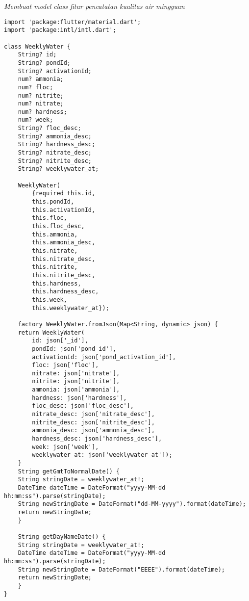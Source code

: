	\textit{Membuat model class fitur pencatatan kualitas air mingguan}
	\begin{lstlisting}
import 'package:flutter/material.dart';
import 'package:intl/intl.dart';

class WeeklyWater {
    String? id;
    String? pondId;
    String? activationId;
    num? ammonia;
    num? floc;
    num? nitrite;
    num? nitrate;
    num? hardness;
    num? week;
    String? floc_desc;
    String? ammonia_desc;
    String? hardness_desc;
    String? nitrate_desc;
    String? nitrite_desc;
    String? weeklywater_at;

    WeeklyWater(
        {required this.id,
        this.pondId,
        this.activationId,
        this.floc,
        this.floc_desc,
        this.ammonia,
        this.ammonia_desc,
        this.nitrate,
        this.nitrate_desc,
        this.nitrite,
        this.nitrite_desc,
        this.hardness,
        this.hardness_desc,
        this.week,
        this.weeklywater_at});

    factory WeeklyWater.fromJson(Map<String, dynamic> json) {
    return WeeklyWater(
        id: json['_id'],
        pondId: json['pond_id'],
        activationId: json['pond_activation_id'],
        floc: json['floc'],
        nitrate: json['nitrate'],
        nitrite: json['nitrite'],
        ammonia: json['ammonia'],
        hardness: json['hardness'],
        floc_desc: json['floc_desc'],
        nitrate_desc: json['nitrate_desc'],
        nitrite_desc: json['nitrite_desc'],
        ammonia_desc: json['ammonia_desc'],
        hardness_desc: json['hardness_desc'],
        week: json['week'],
        weeklywater_at: json['weeklywater_at']);
    }
    String getGmtToNormalDate() {
    String stringDate = weeklywater_at!;
    DateTime dateTime = DateFormat("yyyy-MM-dd hh:mm:ss").parse(stringDate);
    String newStringDate = DateFormat("dd-MM-yyyy").format(dateTime);
    return newStringDate;
    }

    String getDayNameDate() {
    String stringDate = weeklywater_at!;
    DateTime dateTime = DateFormat("yyyy-MM-dd hh:mm:ss").parse(stringDate);
    String newStringDate = DateFormat("EEEE").format(dateTime);
    return newStringDate;
    }
}        
	\end{lstlisting}
	
